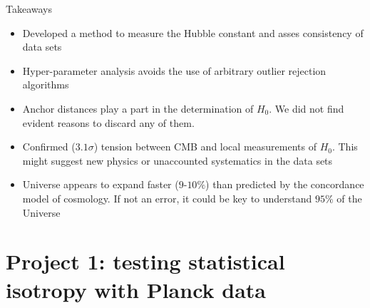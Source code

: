 \documentclass{beamer}
\begin{document}
\begin{frame}{Takeaways}
\begin{itemize}

\item Developed a method to measure the Hubble constant and asses consistency of data sets
\item Hyper-parameter analysis avoids the use of arbitrary outlier rejection algorithms
\item Anchor distances play a part in the determination of $H_0$. We did not find evident reasons to discard any of them. 
\item Confirmed ($3.1\sigma$) tension between CMB and local measurements of $H_0$. This might suggest new physics or unaccounted systematics in the data sets
\item Universe appears to expand faster ($9$-$10\%$) than predicted by the  concordance model of cosmology. If not an error, it could be key to understand $95\%$ of the Universe
\end{itemize}
\end{frame}


\section*{Project 1: testing statistical isotropy with Planck data}
\end{document}
